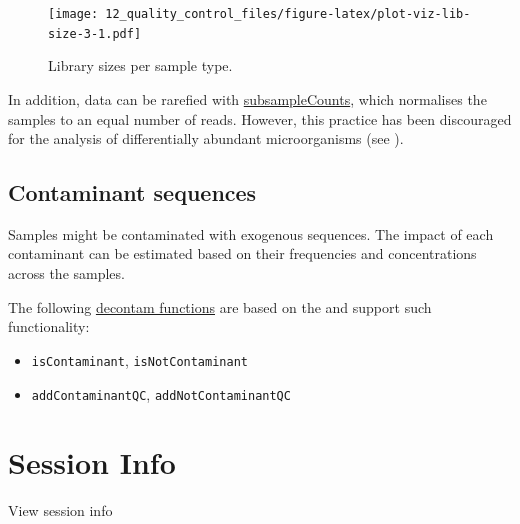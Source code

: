 \documentclass[
]{book}
\providecommand{\tightlist}{%
  \setlength{\itemsep}{0pt}\setlength{\parskip}{0pt}}
\begin{document}
\begin{figure}
\centering
\texttt{[image: 12\_quality\_control\_files/figure-latex/plot-viz-lib-size-3-1.pdf]}
\caption{\label{fig:plot-viz-lib-size-3}Library sizes per sample type.}
\end{figure}

In addition, data can be rarefied with
\href{https://microbiome.github.io/mia/reference/subsampleCounts.html}{subsampleCounts},
which normalises the samples to an equal number of reads. However,
this practice has been discouraged for the analysis of differentially
abundant microorganisms (see \citep{mcmurdie2014waste}).

\hypertarget{contaminant-sequences}{%
\subsection{Contaminant sequences}\label{contaminant-sequences}}

Samples might be contaminated with exogenous sequences. The impact of
each contaminant can be estimated based on their frequencies and
concentrations across the samples.

The following \href{https://microbiome.github.io/mia/reference/isContaminant.html}{decontam functions}
are based on the \citep{davis2018simple} and support such functionality:

\begin{itemize}
\tightlist
\item
  \texttt{isContaminant}, \texttt{isNotContaminant}
\item
  \texttt{addContaminantQC}, \texttt{addNotContaminantQC}
\end{itemize}

\hypertarget{session-info-2}{%
\section*{Session Info}\label{session-info-2}}

View session info
\end{document}
